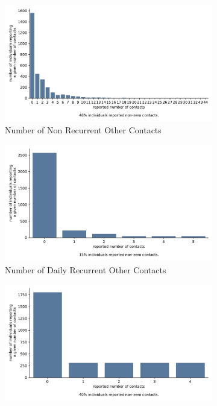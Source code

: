\begin{figure}[ht]
    \centering
    \begin{subfigure}[b]{0.3\textwidth}
        \centering
        \includegraphics[width=\textwidth]{figures/results/figures/data/distributions_of_the_number_of_contacts/other_non_recurrent}
        \caption{Number of Non Recurrent Other Contacts}
        \label{fig:n_contacts_other_non_recurrent}
    \end{subfigure}
    \hfill
    \begin{subfigure}[b]{0.3\textwidth}
        \centering
        \includegraphics[width=\textwidth]{figures/results/figures/data/distributions_of_the_number_of_contacts/other_recurrent_daily}
        \caption{Number of Daily Recurrent Other Contacts}
        \label{fig:n_contacts_other_daily_recurrent}
    \end{subfigure}
    \hfill
    \begin{subfigure}[b]{0.3\textwidth}
        \centering
        \includegraphics[width=\textwidth]{figures/results/figures/data/distributions_of_the_number_of_contacts/other_recurrent_weekly}

\end{subfigure}
\end{figure}
